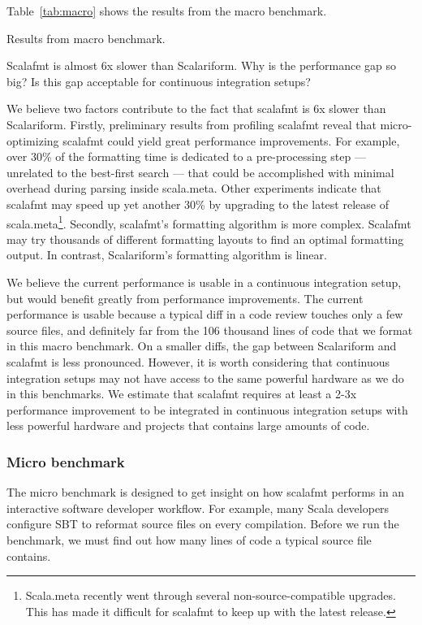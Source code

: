 Table~\ref{tab:macro} shows the results from the macro benchmark.
\begin{table}
  \centering
  \caption{Results from macro benchmark.}\label{tab:macro}
  
\end{table}
Scalafmt is almost 6x slower than Scalariform.
Why is the performance gap so big?
Is this gap acceptable for continuous integration setups?

We believe two factors contribute to the fact that scalafmt is 6x slower than Scalariform.
Firstly, preliminary results from profiling scalafmt reveal that micro-optimizing scalafmt could yield great performance improvements.
For example, over 30\% of the formatting time is dedicated to a pre-processing step --- unrelated to the best-first search --- that could be accomplished with minimal overhead during parsing inside scala.meta.
Other experiments indicate that scalafmt may speed up yet another 30\% by upgrading to the latest release of scala.meta\footnote{
  Scala.meta recently went through several non-source-compatible upgrades.
  This has made it difficult for scalafmt to keep up with the latest release.
}.
Secondly, scalafmt's formatting algorithm is more complex.
Scalafmt may try thousands of different formatting layouts to find an optimal formatting output.
In contrast, Scalariform's formatting algorithm is linear.

We believe the current performance is usable in a continuous integration setup, but would benefit greatly from performance improvements.
The current performance is usable because a typical diff in a code review touches only a few source files, and definitely far from the 106 thousand lines of code that we format in this macro benchmark.
On a smaller diffs, the gap between Scalariform and scalafmt is less pronounced.
However, it is worth considering that continuous integration setups may not have access to the same powerful hardware as we do in this benchmarks.
We estimate that scalafmt requires at least a 2-3x performance improvement to be integrated in continuous integration setups with less powerful hardware and projects that contains large amounts of code.


\subsubsection{Micro benchmark}
The micro benchmark is designed to get insight on how scalafmt performs in an interactive software developer workflow.
For example, many Scala developers configure SBT to reformat source files on every compilation.
Before we run the benchmark, we must find out how many lines of code a typical source file contains.

